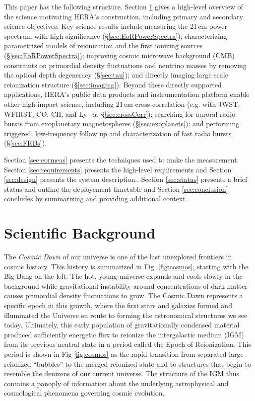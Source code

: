\documentclass[preprint,11pt]{aastex}
\begin{document}
This paper has the following structure.  Section \ref{sec:science} gives a high-level overview of the science motivating HERA's construction, including primary and secondary science objectives.  Key science results include
measuring the 21\,cm power spectrum with high significance (\S\ref{sec:EoRPowerSpectra});
characterizing parametrized models of reionization and the first ionizing sources (\S\ref{sec:EoRPowerSpectra});
improving cosmic microwave background (CMB) constraints on primordial density fluctuations and neutrino masses by removing the optical depth degeneracy (\S\ref{sec:tau}); and
directly imaging large scale reionization structure (\S\ref{sec:imaging}).
Beyond these directly supported applications, HERA's public data products and instrumentation platform enable other high-impact science, including 
21\,cm cross-correlation (e.g. with JWST, WFIRST, CO, CII, and Ly$-\alpha$; \S\ref{sec:crossCorr});
searching for auroral radio bursts from exoplanetary magnetospheres (\S\ref{sec:exoplanets}); and
performing triggered, low-frequency follow up and characterization of fast radio bursts (\S\ref{sec:FRBs}).

Section \ref{sec:eormeas} presents the techniques used to make the measurement.  Section \ref{sec:requirements} presents the high-level requirements and Section \ref{sec:design} presents the system description..   Section \ref{sec:status} presents a brief status and outline the deployement timetable and Section \ref{sec:conclusion} concludes by summarizing and providing additional context.




\section{Scientific Background}
\label{sec:science}

The {\it Cosmic Dawn} of our universe is one of the last unexplored
frontiers in cosmic history.  This history is summarized in Fig. \ref{fig:cosmos}, starting with the Big Bang on the left. The hot, young universe expands and cools slowly in the background while gravitational instability around concentrations of dark matter causes primordial density fluctuations to grow.
The Cosmic Dawn represents a specific epoch in this growth, where the first stars and galaxies formed and illuminated the Universe en route to forming the astronomical structures we see today. Ultimately, this early population of gravitationally condensed material produced sufficiently energetic flux to reionize the intergalactic medium (IGM) from its previous neutral state in a period called the Epoch of Reionization.  This period is shown in Fig \ref{fig:cosmos} as the rapid transition from separated large reionized ``bubbles'' to the merged reionized state and to structures that begin to resemble the denizens of our current universe. The structure of the 
IGM thus contains a panoply of information about the underlying astrophysical and cosmological phenomena governing cosmic evolution.
\end{document}
